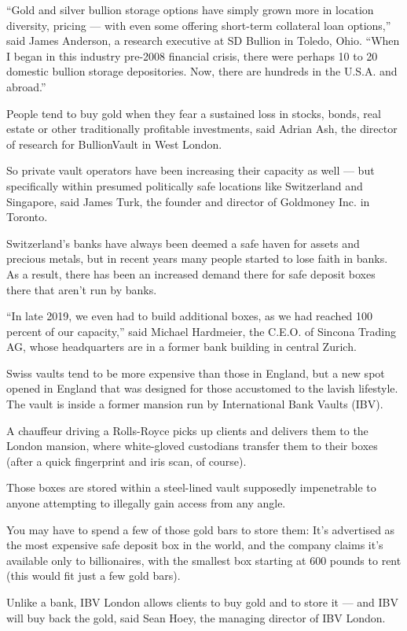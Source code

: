 ``Gold and silver bullion storage options have simply grown more in
location diversity, pricing --- with even some offering short-term
collateral loan options,'' said James Anderson, a research executive at
SD Bullion in Toledo, Ohio. ``When I began in this industry pre-2008
financial crisis, there were perhaps 10 to 20 domestic bullion storage
depositories. Now, there are hundreds in the U.S.A. and abroad.''

People tend to buy gold when they fear a sustained loss in stocks,
bonds, real estate or other traditionally profitable investments, said
Adrian Ash, the director of research for BullionVault in West London.

So private vault operators have been increasing their capacity as well
--- but specifically within presumed politically safe locations like
Switzerland and Singapore, said James Turk, the founder and director of
Goldmoney Inc. in Toronto.

Switzerland's banks have always been deemed a safe haven for assets and
precious metals, but in recent years many people started to lose faith
in banks. As a result, there has been an increased demand there for safe
deposit boxes there that aren't run by banks.

``In late 2019, we even had to build additional boxes, as we had reached
100 percent of our capacity,'' said Michael Hardmeier, the C.E.O. of
Sincona Trading AG, whose headquarters are in a former bank building in
central Zurich.

Swiss vaults tend to be more expensive than those in England, but a new
spot opened in England that was designed for those accustomed to the
lavish lifestyle. The vault is inside a former mansion run by
International Bank Vaults (IBV).

A chauffeur driving a Rolls-Royce picks up clients and delivers them to
the London mansion, where white-gloved custodians transfer them to their
boxes (after a quick fingerprint and iris scan, of course).

Those boxes are stored within a steel-lined vault supposedly
impenetrable to anyone attempting to illegally gain access from any
angle.

You may have to spend a few of those gold bars to store them: It's
advertised as the most expensive safe deposit box in the world, and the
company claims it's available only to billionaires, with the smallest
box starting at 600 pounds to rent (this would fit just a few gold
bars).

Unlike a bank, IBV London allows clients to buy gold and to store it ---
and IBV will buy back the gold, said Sean Hoey, the managing director of
IBV London.


